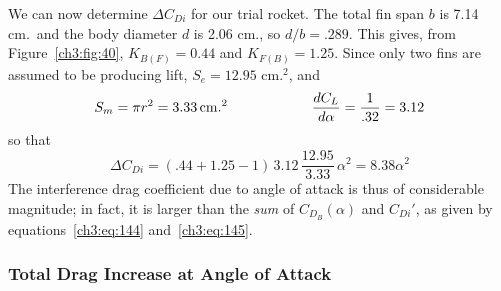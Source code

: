 We can now determine $\Delta C_{Di}$ for our trial rocket. The total fin span $b$ is 7.14 cm.\ and
the body diameter $d$ is 2.06 cm., so $d/b = .289$. This gives, from Figure~\ref{ch3:fig:40},
$K_{B(F)} = 0.44$ and $K_{F(B)} = 1.25$. Since only two fins are assumed to be producing lift,
$S_e = 12.95$ cm.$^{2}$, and
\begin{equation*}
S_m = \pi r^2 = 3.33\,\mathrm{cm.^{2}}
\qquad\qquad\qquad
\frac{dC_L}{d\alpha} = \frac{1}{.32} = 3.12
\end{equation*}
so that
\begin{equation}\label{ch3:eq:147}
\Delta C_{Di} = (.44 + 1.25 - 1)\,3.12\,\frac{12.95}{3.33}\,\alpha^2 = 8.38\alpha^2
\end{equation}
The interference drag coefficient due to angle of attack is thus of considerable magnitude; in
fact, it is larger than the \emph{sum} of $C_{D_B}(\alpha)$ and $C_{Di}'$, as given by
equations~\eqref{ch3:eq:144} and~\eqref{ch3:eq:145}.

\subsubsection{Total Drag Increase at Angle of Attack}\label{ch3:sec:5.2.4}

